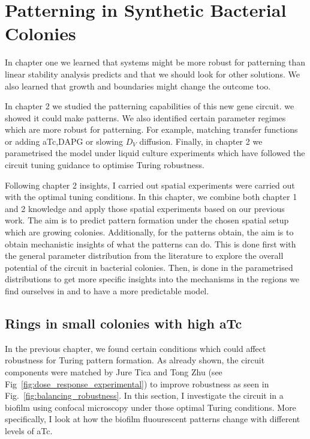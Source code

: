 \chapter{Patterning in Synthetic Bacterial Colonies} \label{chapter3}
In chapter one we learned that systems might be more robust for patterning than linear stability analysis predicts and that we should look for other solutions.
We also learned that growth and boundaries might change the outcome too.

In chapter 2 we studied the patterning capabilities of this new gene circuit. we showed it could make patterns. We also identified certain parameter regimes which are more robust for patterning. For example, matching transfer functions or adding aTc,DAPG or slowing $D_{V}$ diffusion.
Finally, in chapter 2 we parametrised the model under liquid culture experiments which have followed the circuit tuning guidance to optimise Turing robustness.

Following chapter 2 insights, I carried out spatial experiments were carried out with the optimal tuning conditions.
In this chapter, we combine both chapter 1 and 2 knowledge and apply those spatial experiments based on our previous work.
The aim is to predict pattern formation under the chosen spatial setup which are growing colonies.
Additionally, for the patterns obtain, the aim is to obtain mechanistic insights of what the patterns can do.
This is done first with the general parameter distribution from the literature to explore the overall potential of the circuit in bacterial colonies.
Then, is done in the parametrised distributions to get more specific insights into the mechanisms in the regions we find ourselves in and to have a more predictable model.

\section{Rings in small colonies with high aTc}
In the previous chapter, we found certain conditions which could affect robustness for Turing pattern formation.
As already shown, the circuit components were matched by Jure Tica and Tong Zhu (see Fig~\ref{fig:dose_response_experimental}) to improve robustness as seen in Fig.~\ref{fig:balancing_robustness}.
In this section, I investigate the circuit in a biofilm using confocal microscopy under those optimal Turing conditions.
More specifically, I look at how the biofilm fluourescent patterns change with different levels of aTc.

